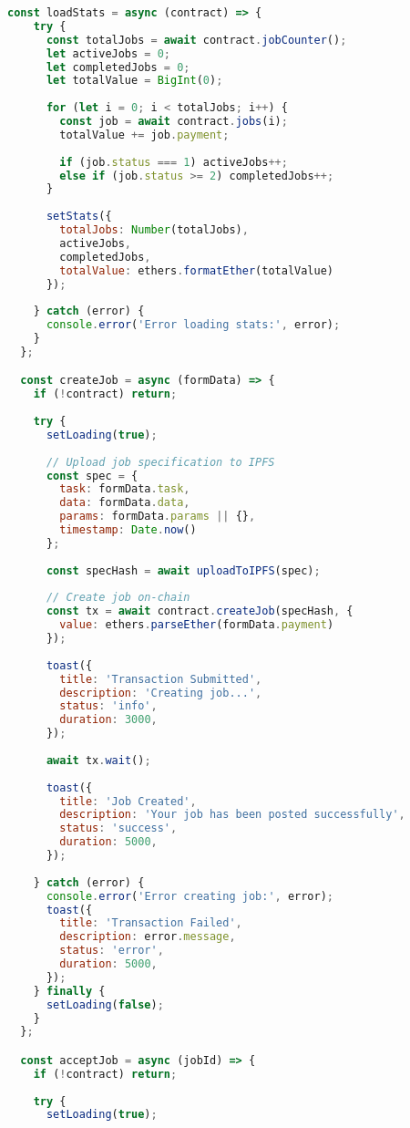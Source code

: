 \begin{lstlisting}[language=JavaScript,caption={App.jsx - Main React Application}]
  const loadStats = async (contract) => {
    try {
      const totalJobs = await contract.jobCounter();
      let activeJobs = 0;
      let completedJobs = 0;
      let totalValue = BigInt(0);
      
      for (let i = 0; i < totalJobs; i++) {
        const job = await contract.jobs(i);
        totalValue += job.payment;
        
        if (job.status === 1) activeJobs++;
        else if (job.status >= 2) completedJobs++;
      }
      
      setStats({
        totalJobs: Number(totalJobs),
        activeJobs,
        completedJobs,
        totalValue: ethers.formatEther(totalValue)
      });
      
    } catch (error) {
      console.error('Error loading stats:', error);
    }
  };

  const createJob = async (formData) => {
    if (!contract) return;
    
    try {
      setLoading(true);
      
      // Upload job specification to IPFS
      const spec = {
        task: formData.task,
        data: formData.data,
        params: formData.params || {},
        timestamp: Date.now()
      };
      
      const specHash = await uploadToIPFS(spec);
      
      // Create job on-chain
      const tx = await contract.createJob(specHash, {
        value: ethers.parseEther(formData.payment)
      });
      
      toast({
        title: 'Transaction Submitted',
        description: 'Creating job...',
        status: 'info',
        duration: 3000,
      });
      
      await tx.wait();
      
      toast({
        title: 'Job Created',
        description: 'Your job has been posted successfully',
        status: 'success',
        duration: 5000,
      });
      
    } catch (error) {
      console.error('Error creating job:', error);
      toast({
        title: 'Transaction Failed',
        description: error.message,
        status: 'error',
        duration: 5000,
      });
    } finally {
      setLoading(false);
    }
  };

  const acceptJob = async (jobId) => {
    if (!contract) return;
    
    try {
      setLoading(true);
      

\end{lstlisting}
